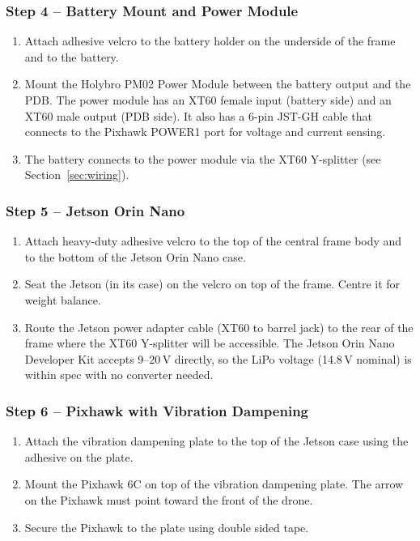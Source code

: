 \documentclass{article}
\begin{document}
\subsubsection{Step 4 -- Battery Mount and Power Module}

\begin{enumerate}
    \item Attach adhesive velcro to the battery holder on the underside of the frame and to the battery.
    \item Mount the Holybro PM02 Power Module between the battery output and the PDB. The power module has an XT60 female input (battery side) and an XT60 male output (PDB side). It also has a 6-pin JST-GH cable that connects to the Pixhawk POWER1 port for voltage and current sensing.
    \item The battery connects to the power module via the XT60 Y-splitter (see Section~\ref{sec:wiring}).
\end{enumerate}

\subsubsection{Step 5 -- Jetson Orin Nano}

\begin{enumerate}
    \item Attach heavy-duty adhesive velcro to the top of the central frame body and to the bottom of the Jetson Orin Nano case.
    \item Seat the Jetson (in its case) on the velcro on top of the frame. Centre it for weight balance.
    \item Route the Jetson power adapter cable (XT60 to barrel jack) to the rear of the frame where the XT60 Y-splitter will be accessible. The Jetson Orin Nano Developer Kit accepts 9--20\,V directly, so the LiPo voltage (14.8\,V nominal) is within spec with no converter needed.
\end{enumerate}

\subsubsection{Step 6 -- Pixhawk with Vibration Dampening}

\begin{enumerate}
    \item Attach the vibration dampening plate to the top of the Jetson case using the adhesive on the plate.
    \item Mount the Pixhawk 6C on top of the vibration dampening plate. The arrow on the Pixhawk must point toward the front of the drone.
    \item Secure the Pixhawk to the plate using double sided tape.
\end{enumerate}
\end{document}
